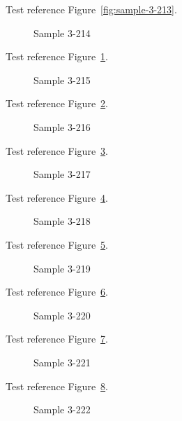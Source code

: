Test reference Figure~\ref{fig:sample-3-213}.

\begin{figure}[tbhp]
\caption{Sample 3-214}
\label{fig:sample-3-214}
\end{figure}

Test reference Figure~\ref{fig:sample-3-214}.

\begin{figure}[tbhp]
\caption{Sample 3-215}
\label{fig:sample-3-215}
\end{figure}

Test reference Figure~\ref{fig:sample-3-215}.

\begin{figure}[tbhp]
\caption{Sample 3-216}
\label{fig:sample-3-216}
\end{figure}

Test reference Figure~\ref{fig:sample-3-216}.

\begin{figure}[tbhp]
\caption{Sample 3-217}
\label{fig:sample-3-217}
\end{figure}

Test reference Figure~\ref{fig:sample-3-217}.

\begin{figure}[tbhp]
\caption{Sample 3-218}
\label{fig:sample-3-218}
\end{figure}

Test reference Figure~\ref{fig:sample-3-218}.

\begin{figure}[tbhp]
\caption{Sample 3-219}
\label{fig:sample-3-219}
\end{figure}

Test reference Figure~\ref{fig:sample-3-219}.

\begin{figure}[tbhp]
\caption{Sample 3-220}
\label{fig:sample-3-220}
\end{figure}

Test reference Figure~\ref{fig:sample-3-220}.

\begin{figure}[tbhp]
\caption{Sample 3-221}
\label{fig:sample-3-221}
\end{figure}

Test reference Figure~\ref{fig:sample-3-221}.

\begin{figure}[tbhp]
\caption{Sample 3-222}
\label{fig:sample-3-222}
\end{figure}

